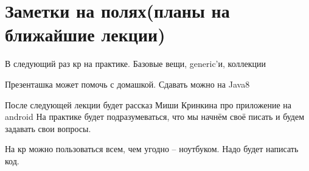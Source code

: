 \section{Заметки на полях(планы на ближайшие лекции)}
В следующий раз кр на практике.
Базовые вещи, generic'и, коллекции

Презенташка может помочь с домашкой. Сдавать можно на Java8

После следующей лекции будет рассказ Миши Кринкина про приложение на android
На практике будет подразумеваться, что мы начнём своё писать и будем задавать свои вопросы.

На кр можно пользоваться всем, чем угодно -- ноутбуком.
Надо будет написать код.
